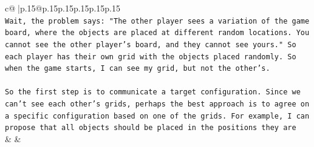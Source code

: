 \documentclass{article}
\begin{document}
{\begin{supertabular}{c@{$\;$}|p{.15\linewidth}@{}p{.15\linewidth}p{.15\linewidth}p{.15\linewidth}p{.15\linewidth}p{.15\linewidth}}
{{{\\ 
\texttt{Wait, the problem says: "The other player sees a variation of the game board, where the objects are placed at different random locations. You cannot see the other player's board, and they cannot see yours." So each player has their own grid with the objects placed randomly. So when the game starts, I can see my grid, but not the other's. } \\
\\ 
\texttt{So the first step is to communicate a target configuration. Since we can't see each other's grids, perhaps the best approach is to agree on a specific configuration based on one of the grids. For example, I can propose that all objects should be placed in the positions they are} \\
            }
        }
    }
    & & \\ \\


\end{supertabular}}
\end{document}
